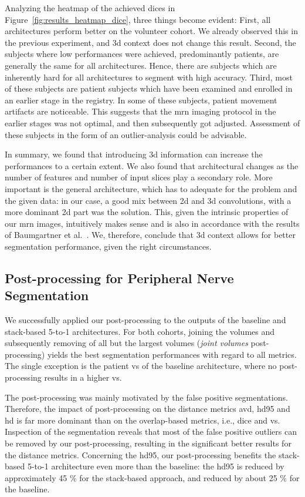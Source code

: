 Analyzing the heatmap of the achieved \gls{dice}s in Figure~\ref{fig:results_heatmap_dice}, three things become evident: First, all architectures perform better on the volunteer cohort. We already observed this in the previous experiment, and \gls{3d} context does not change this result. Second, the subjects where low performances were achieved, predominantly patients, are generally the same for all architectures. Hence, there are subjects which are inherently hard for all architectures to segment with high accuracy. Third, most of these subjects are patient subjects which have been examined and enrolled in an earlier stage in the registry. In some of these subjects, patient movement artifacts are noticeable. This suggests that the \gls{mrn} imaging protocol in the earlier stages was not optimal, and then subsequently got adjusted. Assessment of these subjects in the form of an outlier-analysis could be advisable.

In summary, we found that introducing \gls{3d} information can increase the performances to a certain extent. We also found that architectural changes as the number of features and number of input slices play a secondary role. More important is the general architecture, which has to adequate for the problem and the given data: in our case, a good mix between \gls{2d} and \gls{3d} convolutions, with a more dominant \gls{2d} part was the solution. This, given the intrinsic properties of our \gls{mrn} images, intuitively makes sense and is also in accordance with the results of Baumgartner et al.~\cite{Baumgartner2017AnSegmentation}. We, therefore, conclude that \gls{3d} context allows for better segmentation performance, given the right circumstances.

\subsection{Post-processing for Peripheral Nerve Segmentation}
We successfully applied our post-processing to the outputs of the baseline and stack-based 5-to-1 architectures. For both cohorts, joining the volumes and subsequently removing of all but the largest volumes (\textit{joint volumes} post-processing) yields the best segmentation performances with regard to all metrics. The single exception is the patient \acrlong{vs} of the baseline architecture, where no post-processing results in a higher \gls{vs}.

The post-processing was mainly motivated by the false positive segmentations. Therefore, the impact of post-processing on the distance metrics \gls{avd}, \gls{hd95} and \gls{hd} is far more dominant than on the overlap-based metrics, i.e., \gls{dice} and \gls{vs}. Inspection of the segmentation reveals that most of the false positive outliers can be removed by our post-processing, resulting in the significant better results for the distance metrics.
Concerning the \acrlong{hd95}, our post-processing benefits the stack-based 5-to-1 architecture even more than the baseline: the \gls{hd95} is reduced by approximately 45 \% for the stack-based approach, and reduced by about 25 \% for the baseline.

